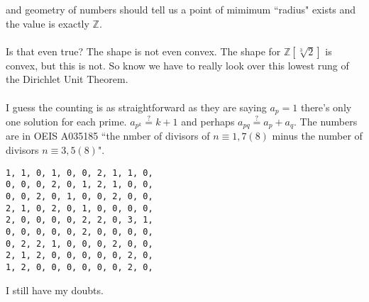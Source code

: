 \documentclass[12pt]{article}
\begin{document}
and geometry of numbers should tell us a point of mimimum ``radius" exists and the value is exactly $\mathbb{Z}$.  \\ \\
Is that even true? The shape is not even convex.  The shape for $\mathbb{Z}[\sqrt[3]{2}]$ is convex, but this is not.  So know we have to really look over this lowest rung of the Dirichlet Unit Theorem. \\ \\
I guess the counting is as straightforward as they are saying $a_p = 1$ there's only one solution for each prime.  $a_{p^k}\stackrel{?}{=} k+1$ and perhaps  $a_{pq} \stackrel{?}{=} a_p + a_q$.  The numbers are in OEIS A035185 ``the nmber of divisors of $n \equiv  1,7 (8)$ minus the number of divisors $n \equiv 3,5 (8)$".

\begin{verbatim}
1, 1, 0, 1, 0, 0, 2, 1, 1, 0, 
0, 0, 0, 2, 0, 1, 2, 1, 0, 0, 
0, 0, 2, 0, 1, 0, 0, 2, 0, 0, 
2, 1, 0, 2, 0, 1, 0, 0, 0, 0, 
2, 0, 0, 0, 0, 2, 2, 0, 3, 1, 
0, 0, 0, 0, 0, 2, 0, 0, 0, 0, 
0, 2, 2, 1, 0, 0, 0, 2, 0, 0, 
2, 1, 2, 0, 0, 0, 0, 0, 2, 0, 
1, 2, 0, 0, 0, 0, 0, 0, 2, 0, 
\end{verbatim}
I still have my doubts.
\end{document}
